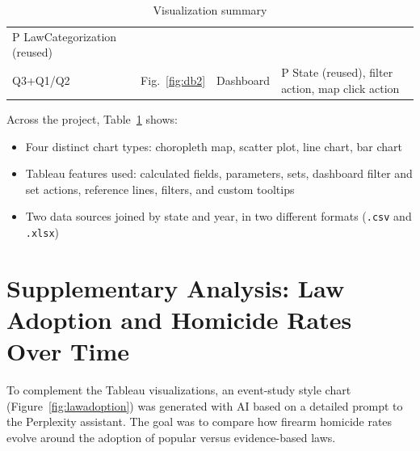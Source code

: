 \documentclass[a4paper,11pt]{article}
\begin{document}
\begin{table}[H]
\begin{tabular}{p{1.0cm} p{1.0cm} p{3.9cm} p{9cm}}
		P LawCategorization (reused)                                                                                                       \\
		\rowcolor{utadrow}
		Q3+Q1/Q2                         & Fig.~\ref{fig:db2}                                                   & Dashboard
		                                 & P State (reused), filter action, map click action                                               \\
		\bottomrule
	\end{tabular}
	\caption{Visualization summary}
	\label{tab:summary}
\end{table}

\par
Across the project, Table~\ref{tab:summary} shows:

\begin{itemize}
	\item Four distinct chart types: choropleth map, scatter plot, line chart, bar chart
	\item Tableau features used: calculated fields, parameters, sets, dashboard filter and set actions,
	      reference lines, filters, and custom tooltips
	\item Two data sources joined by state and year, in two different formats (\texttt{.csv} and \texttt{.xlsx})
\end{itemize}

\section{Supplementary Analysis: Law Adoption and Homicide Rates Over Time}\label{sec:supp}

\par
To complement the Tableau visualizations, an event-study style chart
(Figure~\ref{fig:lawadoption}) was generated with AI based on a detailed
prompt to the Perplexity assistant. The goal was to compare how firearm
homicide rates evolve around the adoption of popular versus evidence-based
laws.
\end{document}
